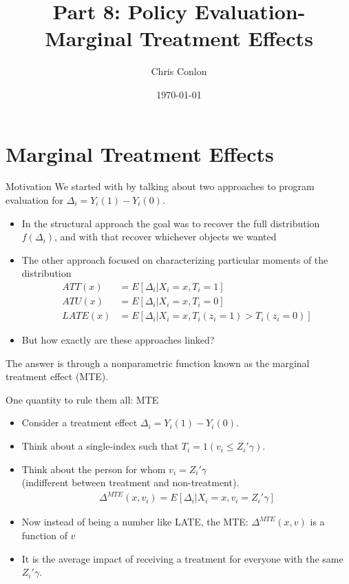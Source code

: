 \documentclass[xcolor=pdftex,dvipsnames,table,mathserif,aspectratio=169]{beamer}
\begin{document}
\title{Part 8: Policy Evaluation- Marginal Treatment Effects}
\author{Chris Conlon}
\date{\today}

\maketitle
\section{Marginal Treatment Effects}


\begin{frame}{Motivation}
We started with by talking about two approaches to program evaluation for $\Delta_i = Y_i(1) - Y_i(0)$.
\begin{itemize}
\item In the \alert{structural approach} the goal was to recover the full distribution $f(\Delta_i)$, and with that recover whichever objects we wanted
\item The other approach focused on characterizing particular moments of the distribution
\begin{align*}
ATT(x) &= E[ \Delta_i | X_i=x, T_{i}=1]\\
ATU(x) &= E[ \Delta_i |  X_i=x,  T_{i}=0]\\
LATE(x) &= E[ \Delta_i |  X_i=x,  T_{i}(z_i=1) > T_{i}(z_i = 0)]
\end{align*}

\item But how exactly are these approaches linked?
\end{itemize}
The answer is through a \alert{nonparametric function} known as the \alert{marginal treatment effect} (MTE).
\end{frame}

\begin{frame}{One quantity to rule them all: MTE}
\begin{itemize}
\item Consider a treatment effect $\Delta_i = Y_{i}(1) - Y_{i}(0)$.
\item Think about a single-index such that $T_i = 1(v_i \leq Z_i' \gamma)$.
\item Think about the person for whom $v_i = Z_i'\gamma$\\
 (indifferent between treatment and non-treatment).
\begin{eqnarray*}
\Delta^{MTE}(x, v_i) = E[\Delta_i | X_i=x, v_i = Z_i'\gamma] 
\end{eqnarray*}
\item Now instead of being \alert{a number} like LATE, the MTE: $\Delta^{MTE}(x, v)$ is a \alert{function} of $v$
\item It is the average impact of receiving a treatment for everyone with the same $Z_i' \gamma$.
\end{itemize}
\end{frame}
\end{document}
